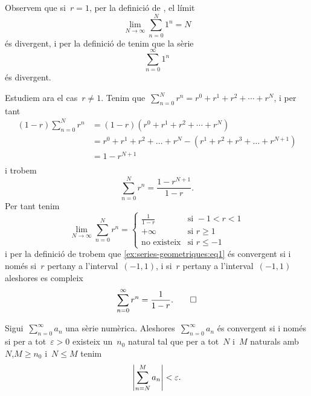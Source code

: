 \documentclass[../../main.tex]{subfiles}
\begin{document}
    \begin{solution}
        Observem que si~\(r=1\), per la definició de , el límit
        \[
            \lim_{N\to\infty}\sum_{n=0}^{N}1^{n}=N
        \]
        és divergent, i per la definició de  tenim que la sèrie
        \[
            \sum_{n=0}^{\infty}1^{n}
        \]
        és divergent.

        Estudiem ara el cas~\(r\neq1\).
        Tenim que~\(\sum_{n=0}^{N}r^{n}=r^{0}+r^{1}+r^{2}+\cdots+r^{N}\), i per tant
        \begin{align*}
            (1-r)\sum_{n=0}^{N}r^{n}&=(1-r)(r^{0}+r^{1}+r^{2}+\cdots+r^{N})\\
            &=r^{0}+r^{1}+r^{2}+\dots+r^{N}-(r^{1}+r^{2}+r^{3}+\dots+r^{N+1})\\
            &=1-r^{N+1}\\
        \end{align*}
        i trobem
        \begin{equation*}
            \sum_{n=0}^{N}r^{n}=\frac{1-r^{N+1}}{1-r}.
        \end{equation*}
        Per tant tenim
        \[\lim_{N\to\infty}\sum_{n=0}^{N}r^{n}=
        \begin{cases}
            \displaystyle \frac{1}{1-r} & \text{si }-1<r<1 \\
            +\infty & \text{si }r\geq1 \\
            \text{no existeix} & \text{si }r\leq-1
        \end{cases}\]
        i per la definició de  trobem que \eqref{ex:series-geometriques:eq1} és convergent si i només si~\(r\) pertany a l'interval~\((-1,1)\), i si~\(r\) pertany a l'interval~\((-1,1)\) aleshores es compleix
        \begin{equation*}
            \sum_{n=0}^{\infty}r^{n}=\frac{1}{1-r}.\qedhere
        \end{equation*}
    \end{solution}
    \begin{theorem}
        \label{thm:Condicio-de-Cauchy-per-series-numeriques}
        Sigui~\(\sum_{n=0}^{\infty}a_{n}\) una sèrie numèrica.
        Aleshores~\(\sum_{n=0}^{\infty}a_{n}\) és convergent si i només si per a tot~\(\varepsilon>0\) existeix un~\(n_{0}\) natural tal que per a tot~\(N\) i~\(M\) naturals amb~\(N\),\(M\geq n_{0}\) i~\(N\leq M\) tenim
        \[
            \abs{\sum_{n=N}^{M}a_{n}}<\varepsilon.
        \]
    \end{theorem}
\end{document}
